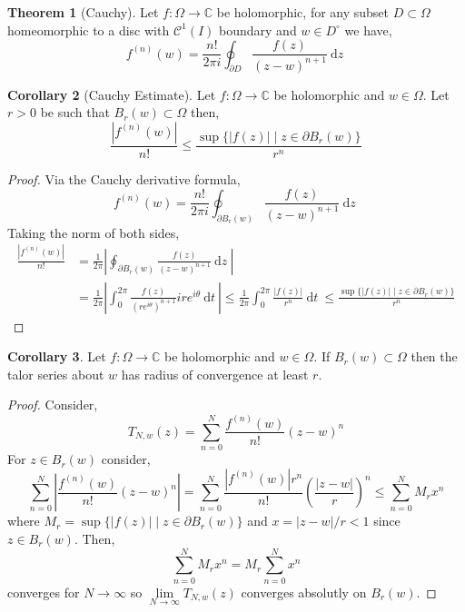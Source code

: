 \documentclass[12pt]{extarticle}
\newcommand{\C}{\mathbb{C}}
\renewcommand{\d}[1]{\: \mathrm{d}#1 \:}
\theoremstyle{definition}
\newtheorem{theorem}{Theorem}[section]
\newtheorem{corollary}[theorem]{Corollary}
\newcommand{\Class}[2]{\mathcal{C}^{#1} \left( #2 \right)}
\begin{document}
\begin{theorem}[Cauchy]
Let $f : \Omega \to \C$ be holomorphic, for any subset $D \subset \Omega$ homeomorphic to a disc with $\Class{1}{I}$ boundary and $w \in D^\circ$ we have,
\[ f^{(n)}(w) = \frac{n !}{2 \pi i} \oint_{\partial D} \frac{f(z)}{(z - w)^{n+1}} \d{z} \]
\end{theorem}

\begin{corollary}[Cauchy Estimate]
Let $f : \Omega \to \C$ be holomorphic and $w \in \Omega$. Let $r > 0$ be such that $B_r(w) \subset \Omega$ then,
\[ \frac{|f^{(n)}(w)|}{n!} \le \frac{\sup \{ |f(z)| \mid z \in \partial B_r(w) \}}{r^n} \]
\end{corollary}

\begin{proof}
Via the Cauchy derivative formula,
\[ f^{(n)}(w) = \frac{n !}{2 \pi i} \oint_{\partial B_r(w)} \frac{f(z)}{(z - w)^{n+1}} \d{z}  \]
Taking the norm of both sides,
\begin{align*}
\frac{|f^{(n)}(w)|}{n!} & = \frac{1}{2 \pi} \left| \oint_{\partial B_r(w)} \frac{f(z)}{(z - w)^{n+1}} \d{z} \right| 
\\
& = \frac{1}{2 \pi} \left| \int_0^{2\pi} \frac{f(z)}{(r e^{i \theta})^{n+1}} i r e^{i \theta} \d{t} \right| \le \frac{1}{2 \pi} \int_0^{2 \pi} \frac{|f(z)|}{r^n} \d{t} \le \frac{\sup \{ |f(z)| \mid z \in \partial B_r(w) \}}{r^n}
\end{align*}
\end{proof}

\begin{corollary}
Let $f : \Omega \to \C$ be holomorphic and $w \in \Omega$. If $B_r(w) \subset \Omega$ then the talor series about $w$ has radius of convergence at least $r$.
\end{corollary}

\begin{proof}
Consider,
\[ T_{N,w}(z) = \sum_{n = 0}^N \frac{f^{(n)}(w)}{n!} (z - w)^n \] 
For $z \in B_r(w)$ consider,
\[ \sum_{n = 0}^N \left| \frac{f^{(n)}(w)}{n!} (z - w)^n \right| = \sum_{n = 0}^N \frac{|f^{(n)}(w)| r^n}{n!} \left( \frac{|z - w|}{r} \right)^n \le \sum_{n = 0}^N M_r x^n \]
where $M_r = \sup \{ |f(z)| \mid z \in \partial B_r(w) \}$ and $x = |z - w|/r < 1$ since $z \in B_r(w)$. Then, 
\[ \sum_{n = 0}^N M_r x^n = M_r \sum_{n = 0}^N x^n \]
converges for $N \to \infty$ so $\lim\limits_{N \to \infty} T_{N,w}(z)$ converges absolutly on $B_r(w)$. 
\end{proof}
\end{document}
